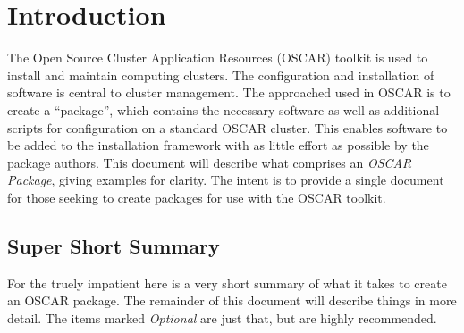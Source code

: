 
\section{Introduction}
\label{sect:intro}

The Open Source Cluster Application Resources (OSCAR) toolkit is used to
install and maintain computing clusters.  The configuration and
installation of software is central to cluster management.  The approached
used in OSCAR is to create a ``package'', which contains the necessary
software as well as additional scripts for configuration on a standard
OSCAR cluster.  This enables software to be added to the installation
framework with as little effort as possible by the package authors.  This
document will describe what comprises an \emph{OSCAR Package}, giving
examples for clarity.  The intent is to provide a single document for those
seeking to create packages for use with the OSCAR toolkit.

\subsection{Super Short Summary}

For the truely impatient here is a very short summary of what it takes to
create an OSCAR package.  The remainder of this document will describe
things in more detail.  The items marked \emph{Optional} are just that, but
are highly recommended.

